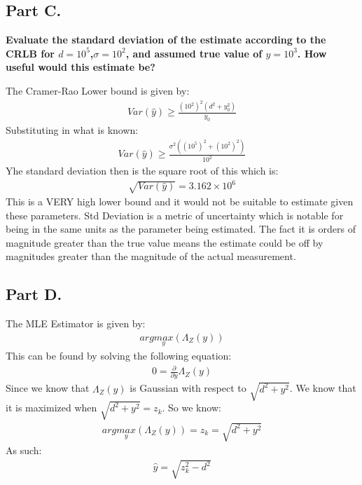\documentclass{article}
\begin{document}
\subsection*{Part C.}
\textbf{Evaluate the standard deviation of the estimate according to the CRLB for $d=10^5$,$\sigma=10^2$, and assumed true value of $y=10^3$. How useful would this estimate be?}

	The Cramer-Rao Lower bound is given by:
\begin{align*}
Var(\hat{y}) \geq \frac{(10^2)^2 (d^2+y_0^2)}{y_0}
\end{align*}
Substituting in what is known:
\begin{align*}
Var(\hat{y}) \geq \frac{\sigma^2 ((10^5)^2+(10^2)^2)}{10^2}
\end{align*}
Yhe standard deviation then is the square root of this which is:
\begin{align*}
\sqrt{Var(\hat{y})} = \boxed{ 3.162\times 10^6 }
\end{align*}
This is a VERY high lower bound and it would not be suitable to estimate given these parameters. Std Deviation is a metric of uncertainty which is notable for being in the same units as the parameter being estimated. The fact it is orders of magnitude greater than the true value means the estimate could be off by magnitudes greater than the magnitude of the actual measurement.
\subsection*{Part D.}
The MLE Estimator is given by:
\begin{align*}
arg \underset{y}{max} (\Lambda_Z(y))
\end{align*}
This can be found by solving the following equation:
\begin{align*}
0 = \frac{\partial}{\partial y} \Lambda_Z(y)
\end{align*}
Since we know that $\Lambda_Z(y)$ is Gaussian with respect to $\sqrt{d^2+y^2}$. We know that it is maximized when $\sqrt{d^2+y^2}=z_k$. So we know:
\begin{align*}
arg \underset{y}{max} (\Lambda_Z(y)) = z_k = \sqrt{d^2+y^2}
\end{align*}
As such:
\begin{align*}
\boxed{ \hat{y} = \sqrt{z_k^2-d^2} }
\end{align*}
\end{document}
